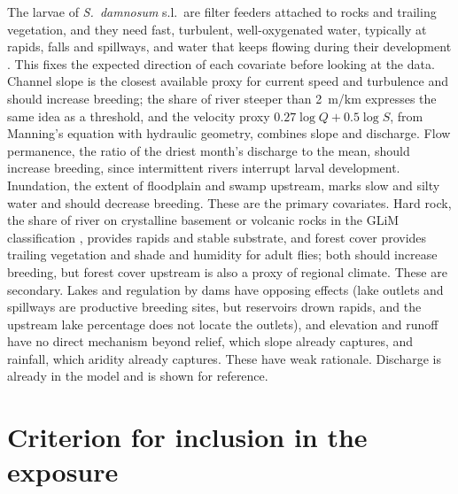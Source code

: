 \documentclass[11pt,a4paper]{article}
\begin{document}
The larvae of \textit{S.~damnosum} s.l.\ are filter feeders attached to rocks and trailing vegetation, and they need fast, turbulent, well-oxygenated water, typically at rapids, falls and spillways, and water that keeps flowing during their development \citep{crosskey1990}. This fixes the expected direction of each covariate before looking at the data. Channel slope is the closest available proxy for current speed and turbulence and should increase breeding; the share of river steeper than 2~m/km expresses the same idea as a threshold, and the velocity proxy $0.27 \log Q + 0.5 \log S$, from Manning's equation with hydraulic geometry, combines slope and discharge. Flow permanence, the ratio of the driest month's discharge to the mean, should increase breeding, since intermittent rivers interrupt larval development. Inundation, the extent of floodplain and swamp upstream, marks slow and silty water and should decrease breeding. These are the primary covariates. Hard rock, the share of river on crystalline basement or volcanic rocks in the GLiM classification \citep{hartmann2012}, provides rapids and stable substrate, and forest cover provides trailing vegetation and shade and humidity for adult flies; both should increase breeding, but forest cover upstream is also a proxy of regional climate. These are secondary. Lakes and regulation by dams have opposing effects (lake outlets and spillways are productive breeding sites, but reservoirs drown rapids, and the upstream lake percentage does not locate the outlets), and elevation and runoff have no direct mechanism beyond relief, which slope already captures, and rainfall, which aridity already captures. These have weak rationale. Discharge is already in the model and is shown for reference.

\section{Criterion for inclusion in the exposure}
\end{document}
